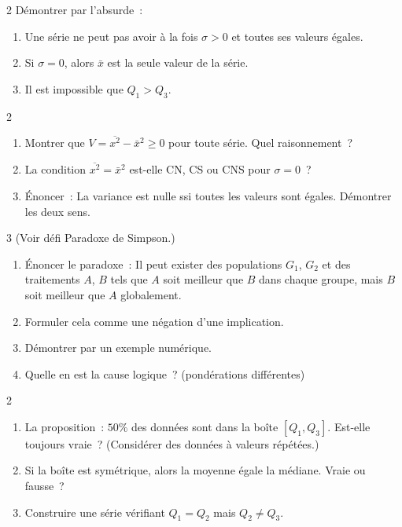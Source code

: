 \begin{exo}{2}
D\'emontrer par l'absurde~:
\begin{enumerate}
  \item Une s\'erie ne peut pas avoir \`a la fois $\sigma>0$ et toutes ses valeurs \'egales.
  \item Si $\sigma=0$, alors $\bar{x}$ est la seule valeur de la s\'erie.
  \item Il est impossible que $Q_1>Q_3$.
\end{enumerate}
\end{exo}

\begin{exo}{2}
\begin{enumerate}
  \item Montrer que $V=\overline{x^2}-\bar{x}^2\geq0$ pour toute s\'erie.
        Quel raisonnement~?
  \item La condition $\overline{x^2}=\bar{x}^2$ est-elle CN, CS ou CNS
        pour $\sigma=0$~?
  \item \'Enoncer~: \og La variance est nulle ssi toutes les valeurs sont \'egales.\fg
        D\'emontrer les deux sens.
\end{enumerate}
\end{exo}

\begin{exo}{3}
(Voir d\'efi Paradoxe de Simpson.)
\begin{enumerate}
  \item \'Enoncer le paradoxe~: \og Il peut exister des populations $G_1$, $G_2$
        et des traitements $A$, $B$ tels que $A$ soit meilleur que $B$ dans
        chaque groupe, mais $B$ soit meilleur que $A$ globalement.\fg
  \item Formuler cela comme une n\'egation d'une implication.
  \item D\'emontrer par un exemple num\'erique.
  \item Quelle en est la cause logique~? (pond\'erations diff\'erentes)
\end{enumerate}
\end{exo}

\begin{exo}{2}
\begin{enumerate}
  \item La proposition~: \og $50\%$ des donn\'ees sont dans la bo\^ite $[Q_1,Q_3]$\fg.
        Est-elle toujours vraie~? (Consid\'erer des donn\'ees \`a valeurs r\'ep\'et\'ees.)
  \item \og Si la bo\^ite est sym\'etrique, alors la moyenne \'egale la m\'ediane.\fg
        Vraie ou fausse~?
  \item Construire une s\'erie v\'erifiant $Q_1=Q_2$ mais $Q_2\ne Q_3$.
\end{enumerate}
\end{exo}

